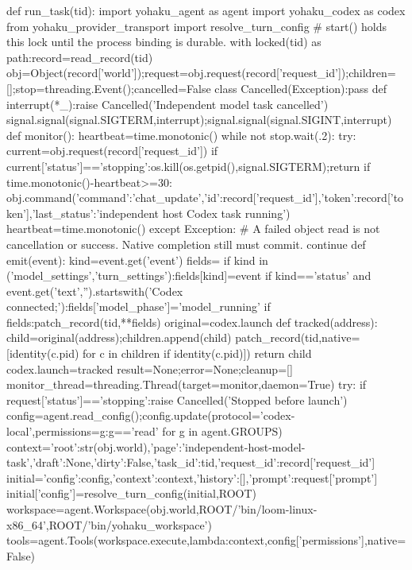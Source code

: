 def run_task(tid):
    import yohaku_agent as agent
    import yohaku_codex as codex
    from yohaku_provider_transport import resolve_turn_config
    # start() holds this lock until the process binding is durable.
    with locked(tid) as path:record=read_record(tid)
    obj=Object(record['world']);request=obj.request(record['request_id']);children=[];stop=threading.Event();cancelled=False
    class Cancelled(Exception):pass
    def interrupt(*_):raise Cancelled('Independent model task cancelled')
    signal.signal(signal.SIGTERM,interrupt);signal.signal(signal.SIGINT,interrupt)
    def monitor():
        heartbeat=time.monotonic()
        while not stop.wait(.2):
            try:
                current=obj.request(record['request_id'])
                if current['status']=='stopping':os.kill(os.getpid(),signal.SIGTERM);return
                if time.monotonic()-heartbeat>=30:
                    obj.command({'command':'chat_update','id':record['request_id'],'token':record['token'],'last_status':'independent host Codex task running'})
                    heartbeat=time.monotonic()
            except Exception:
                # A failed object read is not cancellation or success. Native completion still must commit.
                continue
    def emit(event):
        kind=event.get('event')
        fields={}
        if kind in ('model_settings','turn_settings'):fields[kind]=event
        if kind=='status' and event.get('text','').startswith('Codex connected;'):fields['model_phase']='model_running'
        if fields:patch_record(tid,**fields)
    original=codex.launch
    def tracked(address):
        child=original(address);children.append(child)
        patch_record(tid,native=[identity(c.pid) for c in children if identity(c.pid)])
        return child
    codex.launch=tracked
    result=None;error=None;cleanup=[]
    monitor_thread=threading.Thread(target=monitor,daemon=True)
    try:
        if request['status']=='stopping':raise Cancelled('Stopped before launch')
        config=agent.read_config();config.update(protocol='codex-local',permissions={g:g=='read' for g in agent.GROUPS})
        context={'root':str(obj.world),'page':'independent-host-model-task','draft':None,'dirty':False,'task_id':tid,'request_id':record['request_id']}
        initial={'config':config,'context':context,'history':[],'prompt':request['prompt']}
        initial['config']=resolve_turn_config(initial,ROOT)
        workspace=agent.Workspace(obj.world,ROOT/'bin/loom-linux-x86_64',ROOT/'bin/yohaku_workspace')
        tools=agent.Tools(workspace.execute,lambda:context,config['permissions'],native=False)
